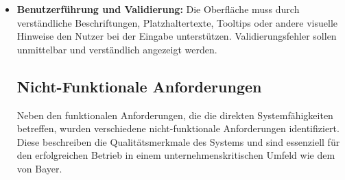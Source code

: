 \begin{itemize}
\item \textbf{Benutzerführung und Validierung:} 
Die Oberfläche muss durch verständliche Beschriftungen, Platzhaltertexte, Tooltips oder andere visuelle Hinweise den Nutzer bei der Eingabe unterstützen. 
Validierungsfehler sollen unmittelbar und verständlich angezeigt werden.
\subsection{Nicht-Funktionale Anforderungen}
Neben den funktionalen Anforderungen, die die direkten Systemfähigkeiten betreffen, wurden verschiedene nicht-funktionale Anforderungen identifiziert. Diese beschreiben die Qualitätsmerkmale des Systems und sind essenziell 
für den erfolgreichen Betrieb in einem unternehmenskritischen Umfeld wie dem von Bayer.

\end{itemize}

